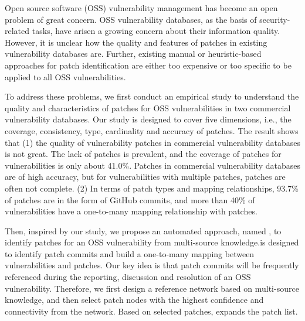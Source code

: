 \begin{abstract*}
Open source software (OSS) vulnerability management has become an open problem of great concern.%
OSS vulnerability databases, as the basis of security-related tasks, have arisen a growing concern about their information quality. However, it is unclear how the quality and features of patches in existing vulnerability databases are. Further, existing manual or heuristic-based approaches for patch identification are either too expensive or too specific to be applied to all OSS vulnerabilities.

To address these problems, we first conduct an empirical study to understand the quality and characteristics of patches for OSS vulnerabilities in two commercial vulnerability databases. Our study is designed to cover five dimensions, i.e., the coverage, consistency, type, cardinality and accuracy of patches. The result shows that (1) the quality of vulnerability patches in commercial vulnerability databases is not great. The lack of patches is prevalent, and the coverage of patches for vulnerabilities is only about 41.0\%. Patches in commercial vulnerability databases are of high accuracy, but for vulnerabilities with multiple patches, patches are often not complete. (2) In terms of patch types and mapping relationships, 93.7\% of patches are in the form of GitHub commits, and more than 40\% of vulnerabilities have a one-to-many mapping relationship with patches.

Then, inspired by our study, we propose an automated approach, named \tool, to identify patches for an OSS vulnerability from multi-source knowledge.\tool is designed to identify patch commits and build a one-to-many mapping between vulnerabilities and patches. Our key idea is that patch commits will be frequently referenced during the reporting, discussion and resolution of an OSS vulnerability. Therefore, we first design a reference network based on multi-source knowledge, and then select patch nodes with the highest confidence and connectivity from the network. Based on selected patches, \tool expands the patch list.


\end{abstract*}

